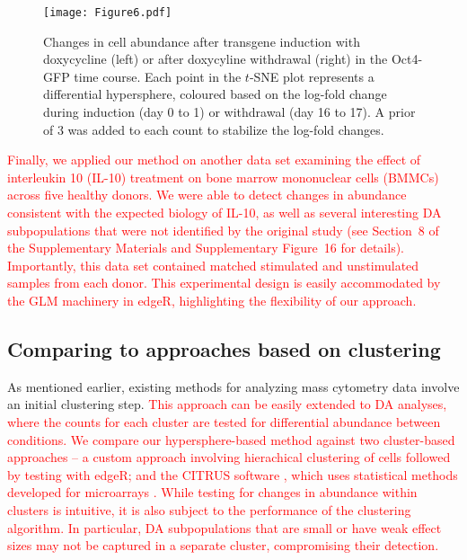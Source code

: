 \documentclass{article}
\newcommand\revised[1]{\textcolor{red}{#1}}
\newcommand{\suppbmmc}{8}
\newcommand{\suppfigbmmc}{16}
\begin{document}
\begin{figure}[bt]
    \begin{center}
        \texttt{[image: Figure6.pdf]}
    \end{center}
    \caption{
        Changes in cell abundance after transgene induction with doxycycline (left) or after doxycyline withdrawal (right) in the Oct4-GFP time course.
        Each point in the $t$-SNE plot represents a differential hypersphere, coloured based on the log-fold change during induction (day 0 to 1) or withdrawal (day 16 to 17).
        A prior of 3 was added to each count to stabilize the log-fold changes.
    }
    \label{fig:importanttime}
\end{figure}

\revised{Finally, we applied our method on another data set \cite{levine2015datadriven} examining the effect of interleukin 10 (IL-10) treatment on bone marrow mononuclear cells (BMMCs) across five healthy donors.
    We were able to detect changes in abundance consistent with the expected biology of IL-10, as well as several interesting DA subpopulations that were not identified by the original study (see Section~\suppbmmc{} of the Supplementary Materials and Supplementary Figure~\suppfigbmmc{} for details).
    Importantly, this data set contained matched stimulated and unstimulated samples from each donor.
    This experimental design is easily accommodated by the GLM machinery in edgeR, highlighting the flexibility of our approach.
}

\subsection{Comparing to approaches based on clustering}
As mentioned earlier, existing methods for analyzing mass cytometry data involve an initial clustering step.
\revised{This approach can be easily extended to DA analyses, where the counts for each cluster are tested for differential abundance between conditions.
We compare our hypersphere-based method against two cluster-based approaches -- a custom approach involving hierachical clustering of cells followed by testing with edgeR; and the CITRUS software \cite{bruggner2014automated}, which uses statistical methods developed for microarrays \cite{tusher2001significance}.
While testing for changes in abundance within clusters is intuitive, it is also subject to the performance of the clustering algorithm.
In particular, DA subpopulations that are small or have weak effect sizes may not be captured in a separate cluster, compromising their detection.
}
\end{document}

